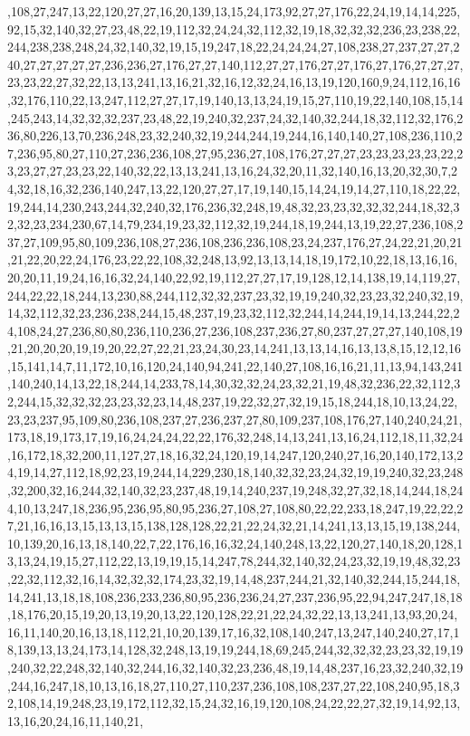 ,108,27,247,13,22,120,27,27,16,20,139,13,15,24,173,92,27,27,176,22,24,19,14,14,225,92,15,32,140,32,27,23,48,22,19,112,32,24,24,32,112,32,19,18,32,32,32,236,23,238,22,244,238,238,248,24,32,140,32,19,15,19,247,18,22,24,24,24,27,108,238,27,237,27,27,240,27,27,27,27,27,236,236,27,176,27,27,140,112,27,27,176,27,27,176,27,176,27,27,27,23,23,22,27,32,22,13,13,241,13,16,21,32,16,12,32,24,16,13,19,120,160,9,24,112,16,16,32,176,110,22,13,247,112,27,27,17,19,140,13,13,24,19,15,27,110,19,22,140,108,15,14,245,243,14,32,32,32,237,23,48,22,19,240,32,237,24,32,140,32,244,18,32,112,32,176,236,80,226,13,70,236,248,23,32,240,32,19,244,244,19,244,16,140,140,27,108,236,110,27,236,95,80,27,110,27,236,236,108,27,95,236,27,108,176,27,27,27,23,23,23,23,23,22,23,23,27,27,23,23,22,140,32,22,13,13,241,13,16,24,32,20,11,32,140,16,13,20,32,30,7,24,32,18,16,32,236,140,247,13,22,120,27,27,17,19,140,15,14,24,19,14,27,110,18,22,22,19,244,14,230,243,244,32,240,32,176,236,32,248,19,48,32,23,23,32,32,32,244,18,32,32,32,23,234,230,67,14,79,234,19,23,32,112,32,19,244,18,19,244,13,19,22,27,236,108,237,27,109,95,80,109,236,108,27,236,108,236,236,108,23,24,237,176,27,24,22,21,20,21,21,22,20,22,24,176,23,22,22,108,32,248,13,92,13,13,14,18,19,172,10,22,18,13,16,16,20,20,11,19,24,16,16,32,24,140,22,92,19,112,27,27,17,19,128,12,14,138,19,14,119,27,244,22,22,18,244,13,230,88,244,112,32,32,237,23,32,19,19,240,32,23,23,32,240,32,19,14,32,112,32,23,236,238,244,15,48,237,19,23,32,112,32,244,14,244,19,14,13,244,22,24,108,24,27,236,80,80,236,110,236,27,236,108,237,236,27,80,237,27,27,27,140,108,19,21,20,20,20,19,19,20,22,27,22,21,23,24,30,23,14,241,13,13,14,16,13,13,8,15,12,12,16,15,141,14,7,11,172,10,16,120,24,140,94,241,22,140,27,108,16,16,21,11,13,94,143,241,140,240,14,13,22,18,244,14,233,78,14,30,32,32,24,23,32,21,19,48,32,236,22,32,112,32,244,15,32,32,32,23,23,32,23,14,48,237,19,22,32,27,32,19,15,18,244,18,10,13,24,22,23,23,237,95,109,80,236,108,237,27,236,237,27,80,109,237,108,176,27,140,240,24,21,173,18,19,173,17,19,16,24,24,24,22,22,176,32,248,14,13,241,13,16,24,112,18,11,32,24,16,172,18,32,200,11,127,27,18,16,32,24,120,19,14,247,120,240,27,16,20,140,172,13,24,19,14,27,112,18,92,23,19,244,14,229,230,18,140,32,32,23,24,32,19,19,240,32,23,248,32,200,32,16,244,32,140,32,23,237,48,19,14,240,237,19,248,32,27,32,18,14,244,18,244,10,13,247,18,236,95,236,95,80,95,236,27,108,27,108,80,22,22,233,18,247,19,22,22,27,21,16,16,13,15,13,13,15,138,128,128,22,21,22,24,32,21,14,241,13,13,15,19,138,244,10,139,20,16,13,18,140,22,7,22,176,16,16,32,24,140,248,13,22,120,27,140,18,20,128,13,13,24,19,15,27,112,22,13,19,19,15,14,247,78,244,32,140,32,24,23,32,19,19,48,32,23,22,32,112,32,16,14,32,32,32,174,23,32,19,14,48,237,244,21,32,140,32,244,15,244,18,14,241,13,18,18,108,236,233,236,80,95,236,236,24,27,237,236,95,22,94,247,247,18,18,18,176,20,15,19,20,13,19,20,13,22,120,128,22,21,22,24,32,22,13,13,241,13,93,20,24,16,11,140,20,16,13,18,112,21,10,20,139,17,16,32,108,140,247,13,247,140,240,27,17,18,139,13,13,24,173,14,128,32,248,13,19,19,244,18,69,245,244,32,32,32,23,23,32,19,19,240,32,22,248,32,140,32,244,16,32,140,32,23,236,48,19,14,48,237,16,23,32,240,32,19,244,16,247,18,10,13,16,18,27,110,27,110,237,236,108,108,237,27,22,108,240,95,18,32,108,14,19,248,23,19,172,112,32,15,24,32,16,19,120,108,24,22,22,27,32,19,14,92,13,13,16,20,24,16,11,140,21,